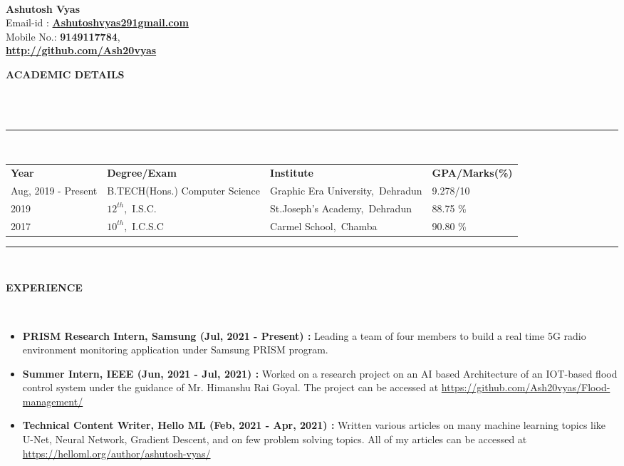 \documentclass[a4paper,10pt]{article}
\newcommand{\lsep}{-0.5cm}
\newcommand{\resheading}[1]{{\small \colorbox{mygrey}{\begin{minipage}{0.975\textwidth}{\textbf{#1 \vphantom{p\^{E}}}}\end{minipage}}}}
\begin{document}
\hspace{0.5cm}\\[-0.2cm]

\textbf{Ashutosh Vyas} \\
\indent Email-id : \textbf{\url{Ashutoshvyas291gmail.com}} \\
\indent Mobile No.: \textbf{9149117784}, \ \\
\indent \textbf{\url{http://github.com/Ash20vyas}}\\

\resheading{\textbf{ACADEMIC DETAILS} }\\[\lsep]
\\
\indent \rule{6.8in}{0.4pt}\\
\indent \begin{tabular}{ l @{\hskip 0.15in} l @{\hskip 0.15in} l @{\hskip 0.15in} l @{\hskip 0.15in} }
\noindent \textbf{Year} & \textbf{Degree/Exam} & \textbf{Institute} & \textbf{GPA/Marks(\%)}\\
Aug, 2019 - Present & B.TECH(Hons.) Computer Science & Graphic Era University,\ Dehradun & 9.278/10 \\
2019 & $12^{th}$,\ I.S.C. & St.Joseph's Academy,\ Dehradun & 88.75 \% \\
2017 & $10^{th}$,\ I.C.S.C & Carmel School,\ Chamba & 90.80 \%\\

\end{tabular}
\indent \rule{6.8in}{0.4pt}
\\

\resheading{\textbf{EXPERIENCE} }\\[\lsep]
\begin{itemize}
\setlength\itemsep{0.5em}
\item \textbf{PRISM Research Intern, Samsung (Jul, 2021 - Present) : }
Leading a team of four members to build a real time 5G radio environment monitoring application under Samsung PRISM program.
\item \textbf{Summer Intern, IEEE (Jun, 2021 - Jul, 2021) : }
Worked on a research project on an AI based Architecture of an IOT-based flood control system under the guidance of Mr. Himanshu Rai Goyal.
The project can be accessed at \url{https://github.com/Ash20vyas/Flood-management/}
\item \textbf{Technical Content Writer, Hello ML (Feb, 2021 - Apr, 2021) : }Written various articles on many machine learning topics like U-Net,  Neural Network, Gradient Descent, and on few problem solving topics.
All of my articles can be accessed at \url{https://helloml.org/author/ashutosh-vyas/}
\end{itemize}
\end{document}

